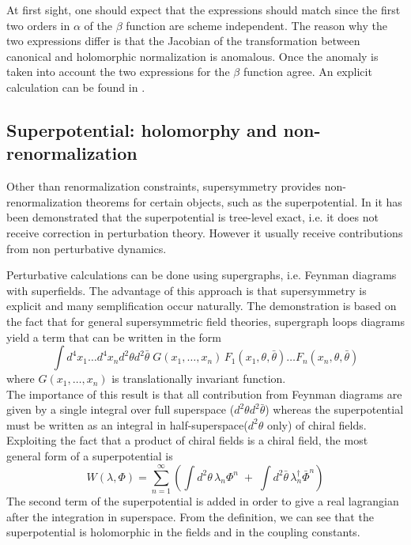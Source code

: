 At first sight, one should expect that the expressions should match since the first two orders in $\alpha$ of the $\beta$ function are scheme independent. 
The reason why the two expressions differ is that the Jacobian of the transformation between canonical and holomorphic normalization is anomalous. 
Once the anomaly is taken into account the two expressions for the $\beta$ function agree. An explicit calculation can be found in \cite{ArkaniHamed:1997mj}.










\subsection{Superpotential: holomorphy and non-renormalization}
Other than renormalization constraints, supersymmetry provides non-renormalization theorems for certain objects, such as the superpotential.
In \cite{Grisaru:1979wc} it has been demonstrated that the superpotential is tree-level exact, i.e. it does not receive correction in perturbation theory. 
However it usually receive contributions from non perturbative dynamics.

Perturbative calculations can be done using supergraphs, i.e. Feynman diagrams with superfields. 
The advantage of this approach is that supersymmetry is explicit and many semplification occur naturally. 
The demonstration is based on the fact that for general supersymmetric field theories, supergraph loops diagrams yield a term that can be written in the form
\begin{equation}
\int  d^4 x_1 \dots d^4 x_n d^2 \theta d^2 \bar{\theta} \; G (x_1 , \dots , x_n) \,F_1 ( x_1, \theta, \bar{\theta}) \dots  F_n ( x_n, \theta, \bar{\theta}) 
\end{equation} 
where $G (x_1 , \dots , x_n) $ is translationally invariant function.\\
The importance of this result is that all contribution from Feynman diagrams are given by a single integral over full superspace ($d^2 \theta d^2 \bar{\theta} $) whereas the superpotential must be written as an integral in half-superspace($d^2 \theta $ only) of chiral fields.
Exploiting the fact that a product of chiral fields is a chiral field, the most general form of a superpotential is 
\begin{equation}
 W (\lambda, \Phi) = \sum_{n=1}^{\infty} \left( \int d^2 \theta \, \lambda_n \Phi^n  \; +\;  \int d^2 \bar{\theta} \, \lambda_n^{\dagger} \bar{\Phi}^n \right)
 \end{equation} 
 The second term of the superpotential is added in order to give a real lagrangian after the integration in superspace.
From the definition, we can see that the superpotential is holomorphic in the fields and in the coupling constants.

